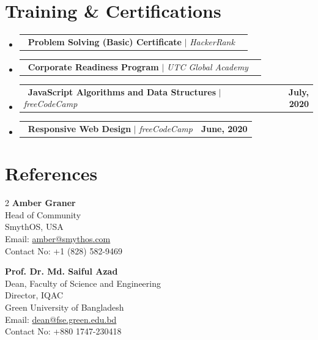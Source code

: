 \documentclass[a4paper,12pt]{extarticle}
\makeatletter
\renewcommand{\small}{\fontsize{11pt}{13.4pt}\selectfont}
\newcommand{\resumeProjectHeading}[2]{
    \item
    \begin{tabular*}{1.001\textwidth}{l@{\extracolsep{\fill}}r}
      \small#1 & \textbf{\small \color{primarycolor}#2}\\
    \end{tabular*}\vspace{-7pt}
}
\newcommand{\resumeSubHeadingListStart}{\begin{itemize}[leftmargin=0.0in, label={}]}
\newcommand{\resumeSubHeadingListEnd}{\end{itemize}}
\makeatother
\begin{document}
\section{Training \& Certifications}
\vspace{2pt}
    \resumeSubHeadingListStart
      \resumeProjectHeading
          {\faCertificate\ \textbf{\color{accentcolor}Problem Solving (Basic) Certificate} $|$ \emph{HackerRank}}{}
          \vspace{-10pt}
      \resumeProjectHeading
          {\faCertificate\ \textbf{\color{accentcolor}Corporate Readiness Program} $|$ \emph{UTC Global Academy}}{}
          \vspace{-10pt}
      \resumeProjectHeading
          {\faCertificate\ \textbf{\color{accentcolor}JavaScript Algorithms and Data Structures} $|$ \emph{freeCodeCamp}}{July, 2020}
          \vspace{-10pt}
      \resumeProjectHeading
          {\faCertificate\ \textbf{\color{accentcolor}Responsive Web Design} $|$ \emph{freeCodeCamp}}{June, 2020}
    \resumeSubHeadingListEnd
\vspace{-0.5cm}
\section{References}
\vspace{2pt}
\begin{multicols}{2}
\noindent
\textbf{\color{accentcolor}Amber Graner} \\
Head of Community \\
SmythOS, USA \\
Email: \href{mailto:amber@smythos.com}{amber@smythos.com} \\
Contact No: +1 (828) 582-9469

\columnbreak

\noindent
\textbf{\color{accentcolor}Prof. Dr. Md. Saiful Azad} \\
Dean, Faculty of Science and Engineering \\
Director, IQAC \\
Green University of Bangladesh \\
Email: \href{mailto:dean@fse.green.edu.bd}{dean@fse.green.edu.bd} \\
Contact No: +880 1747-230418
\end{multicols}
\end{document}
